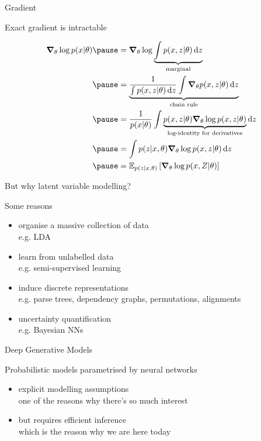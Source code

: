 \documentclass[14pt]{beamer}
\begin{document}
\begin{frame}{Gradient}

Exact gradient is intractable
\begin{small}
\begin{equation*}
\begin{aligned}
\grad_\theta \log p(x|\theta) \pause &= \grad_\theta \log \underbrace{\int p(x, z|\theta) \dd{z}}_{\text{marginal}} \\ \pause
&= \underbrace{\frac{1}{\int p(x, z|\theta) \dd{z}} \int \grad_\theta p(x,z|\theta) \dd{z}}_{\text{chain rule}} \\ \pause
&= \frac{1}{p(x|\theta)} \int \underbrace{p(x,z|\theta) \grad_\theta \log p(x,z|\theta)}_{\text{log-identity for derivatives}} \dd{z} \\ \pause
&= \int p(z|x, \theta) \grad_\theta \log p(x,z|\theta) \dd{z} \\ \pause
&= \mathbb E_{p(z|x, \theta)} \left[ \grad_\theta \log p(x,Z|\theta) \right]
\end{aligned}
\end{equation*}
\end{small}



\end{frame}


\begin{frame}{But why latent variable modelling?}

Some reasons

\begin{itemize}
	\item organise a massive collection of data\\
	e.g. LDA	 \pause
	\item learn from unlabelled data\\
	e.g. semi-supervised learning \pause
	\item induce discrete representations\\
	e.g. parse trees, dependency graphs, permutations, alignments \pause
	\item uncertainty quantification\\
	e.g. Bayesian NNs 
\end{itemize}

\end{frame}


\begin{frame}{Deep Generative Models}

Probabilistic models parametrised by neural networks
\begin{itemize}
	\pause
	\item explicit modelling assumptions\\
	one of the reasons why there's so much interest	
	\pause
	\item but requires efficient inference\\
	\pause
	\alert{which is the reason why we are here today}
\end{itemize}

\end{frame}
\end{document}
